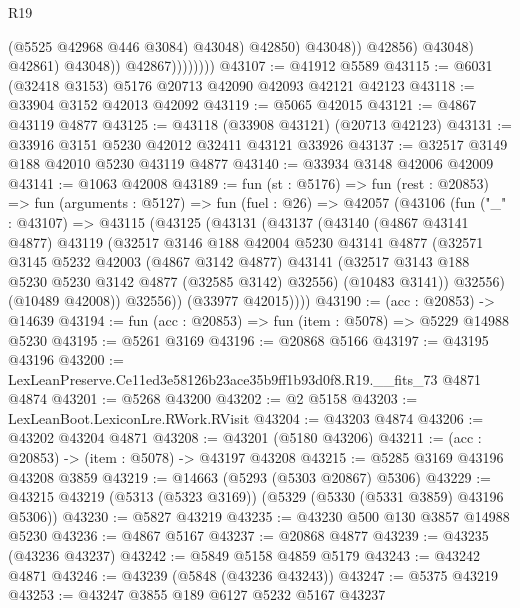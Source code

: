 \begin{lexlean}{R19}
\begin{coremodule}
                                      (@5525 @42968 @446 @3084)
                                      @43048)
                                    @42850)
                                  @43048))
                              @42856)
                            @43048)
                          @42861)
                        @43048))
                    @42867))))))))
@43107 := @41912 @5589
@43115 := @6031 (@32418 @3153) @5176 @20713 @42090 @42093 @42121 @42123
@43118 := @33904 @3152 @42013 @42092
@43119 := @5065 @42015
@43121 := @4867 @43119 @4877
@43125 := @43118 (@33908 @43121) (@20713 @42123)
@43131 := @33916 @3151 @5230 @42012 @32411 @43121 @33926
@43137 := @32517 @3149 @188 @42010 @5230 @43119 @4877
@43140 := @33934 @3148 @42006 @42009
@43141 := @1063 @42008
@43189 := fun (st : @5176) =>
  fun (rest : @20853) =>
  fun (arguments : @5127) =>
  fun (fuel : @26) =>
  @42057
    (@43106
      (fun ("_" : @43107) =>
      @43115
        (@43125
          (@43131
            (@43137
              (@43140
                (@4867 @43141 @4877)
                @43119
                (@32517
                  @3146
                  @188
                  @42004
                  @5230
                  @43141
                  @4877
                  (@32571
                    @3145
                    @5232
                    @42003
                    (@4867 @3142 @4877)
                    @43141
                    (@32517 @3143 @188 @5230 @5230 @3142 @4877 (@32585 @3142) @32556)
                    (@10483 @3141))
                  @32556)
                (@10489 @42008))
              @32556))
          (@33977 @42015))))
@43190 := (acc : @20853) -> @14639
@43194 := fun (acc : @20853) => fun (item : @5078) => @5229 @14988 @5230
@43195 := @5261 @3169
@43196 := @20868 @5166
@43197 := @43195 @43196
@43200 := LexLeanPreserve.Ce11ed3e58126b23ace35b9ff1b93d0f8.R19.__fits_73 @4871 @4874
@43201 := @5268 @43200
@43202 := @2 @5158
@43203 := LexLeanBoot.LexiconLre.RWork.RVisit
@43204 := @43203 @4874
@43206 := @43202 @43204 @4871
@43208 := @43201 (@5180 @43206)
@43211 := (acc : @20853) -> (item : @5078) -> @43197 @43208
@43215 := @5285 @3169 @43196 @43208 @3859
@43219 := @14663 (@5293 (@5303 @20867) @5306)
@43229 := @43215 @43219 (@5313 (@5323 @3169)) (@5329 (@5330 (@5331 @3859) @43196 @5306))
@43230 := @5827 @43219
@43235 := @43230 @500 @130 @3857 @14988 @5230
@43236 := @4867 @5167
@43237 := @20868 @4877
@43239 := @43235 (@43236 @43237)
@43242 := @5849 @5158 @4859 @5179
@43243 := @43242 @4871
@43246 := @43239 (@5848 (@43236 @43243))
@43247 := @5375 @43219
@43253 := @43247 @3855 @189 @6127 @5232 @5167 @43237

\end{coremodule}
\end{lexlean}
